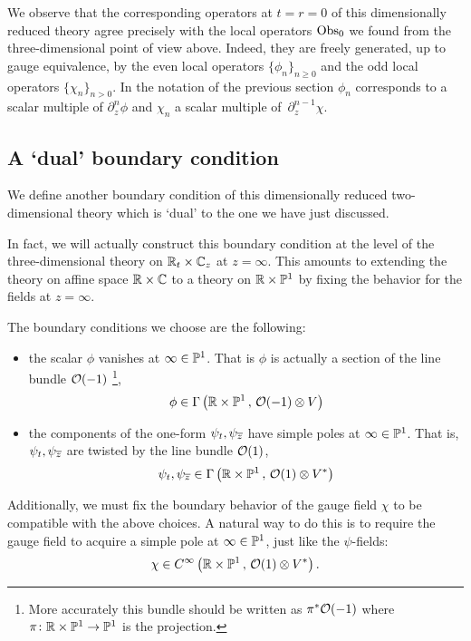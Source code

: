 \documentclass[11pt]{amsart}
\begin{document}
We observe that the corresponding operators at $t = r = 0$ of this dimensionally reduced theory agree precisely with the local operators ${\rm Obs}_0$ we found from the three-dimensional point of view above. 
Indeed, they are freely generated, up to gauge equivalence, by the even local operators $\{\phi_n\}_{n \geq 0}$ and the odd local operators $\{\chi_n\}_{n > 0}$. 
In the notation of the previous section $\phi_n$ corresponds to a scalar multiple of $\partial_z^n \phi$ and $\chi_n$ a scalar multiple of~$\partial^{n-1}_z \chi$. 

\subsection*{A `dual' boundary condition} 

We define another boundary condition of this dimensionally reduced two-dimensional theory which is `dual' to the one we have just discussed. 

In fact, we will actually construct this boundary condition at the level of the three-dimensional theory on $\mathbb R_t \times \mathbb C_z$ at $z = \infty$. 
This amounts to extending the theory on affine space $\mathbb R \times \mathbb C$ to a theory on $\mathbb R \times \mathbb P^1$ by fixing the behavior for the fields at $z = \infty$. 

The boundary conditions we choose are the following:
\begin{itemize}
\item the scalar $\phi$ vanishes at $\infty \in \mathbb P^1$. 
That is $\phi$ is actually a section of the line bundle $\mathcal O(-1)$ \footnote{More accurately this bundle should be written as $\pi^* \mathcal O(-1)$ where $\pi \colon \mathbb R \times \mathbb P^1 \to \mathbb P^1$ is the projection.}, 
\[
\phi \in \Gamma \left(\mathbb R \times \mathbb P^1 \, , \, \mathcal O(-1) \otimes V \right) 
\]
\item the components of the one-form $\psi_{t}, \psi_{{\overline{z}}}$ have simple poles at $\infty \in \mathbb P^1$.
That is, $\psi_t,\psi_{{\overline{z}}}$ are twisted by the line bundle $\mathcal O(1)$,
\[
\psi_{t}, \psi_{{\overline{z}}}\in \Gamma\left(\mathbb R \times \mathbb P^1 \, , \, \mathcal O(1) \otimes V^*\right)
\]
\end{itemize}

Additionally, we must fix the boundary behavior of the gauge field $\chi$ to be compatible with the above choices.
A natural way to do this is to require the gauge field to acquire a simple pole at $\infty \in \mathbb P^1$, just like the $\psi$-fields:
\[
\chi \in C^\infty\left(\mathbb R \times \mathbb P^1 \, , \, \mathcal O(1) \otimes V^*\right) .
\]
\end{document}
